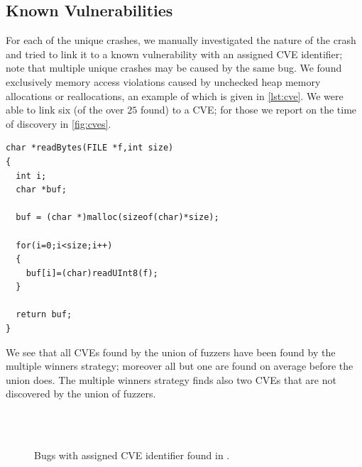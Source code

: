\subsection{Known Vulnerabilities}

For each of the unique crashes, we manually investigated the nature of the crash
and tried to link it to a known vulnerability with an assigned \ac{CVE}
identifier; note that multiple unique crashes may be caused by the same bug. We
found exclusively memory access violations caused by unchecked heap memory
allocations or reallocations, an example of which is given in \autoref{lst:cve}.
We were able to link six (of the over $25$ found) to a \ac{CVE}; for those we
report on the time of discovery in \autoref{fig:cves}.

\begin{lstlisting}[caption={Unchecked memory allocation in
                            \texttt{util/read.c:222} causing CVE-2017-7582.},
                   label=lst:cve, float=h, basicstyle=\ttfamily\footnotesize]
char *readBytes(FILE *f,int size)
{
  int i;
  char *buf;

  buf = (char *)malloc(sizeof(char)*size);

  for(i=0;i<size;i++)
  {
    buf[i]=(char)readUInt8(f);
  }

  return buf;
}
\end{lstlisting}

We see that all \acp{CVE} found by the union of fuzzers have been found by the
multiple winners strategy; moreover all but one are found on average before the
union does. The multiple winners strategy finds also two \acp{CVE} that are not
discovered by the union of fuzzers.

\begin{figure}[t]
    \centering%
    \\
    \\
    \caption{Bugs with assigned \acs{CVE} identifier found in \listswf.}
    \label{fig:cves}
\end{figure}

